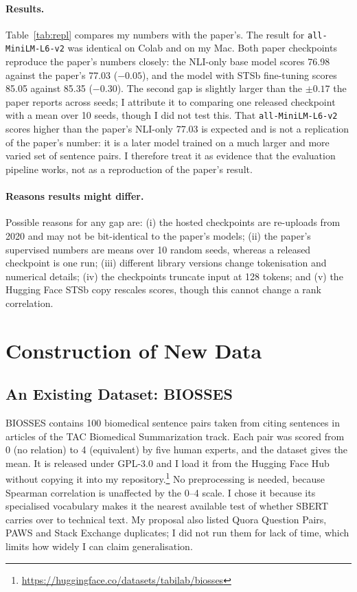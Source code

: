 \documentclass[11pt]{article}
\begin{document}
\paragraph{Results.}
Table~\ref{tab:repl} compares my numbers with the paper's. The result for \texttt{all-MiniLM-L6-v2} was identical on Colab and on my Mac. Both paper checkpoints reproduce the paper's numbers closely: the NLI-only base model scores 76.98 against the paper's 77.03 ($-0.05$), and the model with STSb fine-tuning scores 85.05 against 85.35 ($-0.30$). The second gap is slightly larger than the $\pm 0.17$ the paper reports across seeds; I attribute it to comparing one released checkpoint with a mean over 10 seeds, though I did not test this. That \texttt{all-MiniLM-L6-v2} scores higher than the paper's NLI-only 77.03 is expected and is not a replication of the paper's number: it is a later model trained on a much larger and more varied set of sentence pairs. I therefore treat it as evidence that the evaluation pipeline works, not as a reproduction of the paper's result.

\paragraph{Reasons results might differ.}
Possible reasons for any gap are: (i) the hosted checkpoints are re-uploads from 2020 and may not be bit-identical to the paper's models; (ii) the paper's supervised numbers are means over 10 random seeds, whereas a released checkpoint is one run; (iii) different library versions change tokenisation and numerical details; (iv) the checkpoints truncate input at 128 tokens; and (v) the Hugging Face STSb copy rescales scores, though this cannot change a rank correlation.

\section{Construction of New Data}
\label{sec:newdata}

\subsection{An Existing Dataset: BIOSSES}
BIOSSES \citep{soganciouglu2017biosses} contains 100 biomedical sentence pairs taken from citing sentences in articles of the TAC Biomedical Summarization track. Each pair was scored from 0 (no relation) to 4 (equivalent) by five human experts, and the dataset gives the mean. It is released under GPL-3.0 and I load it from the Hugging Face Hub without copying it into my repository.\footnote{\url{https://huggingface.co/datasets/tabilab/biosses}} No preprocessing is needed, because Spearman correlation is unaffected by the 0--4 scale. I chose it because its specialised vocabulary makes it the nearest available test of whether SBERT carries over to technical text. My proposal also listed Quora Question Pairs, PAWS and Stack Exchange duplicates; I did not run them for lack of time, which limits how widely I can claim generalisation.
\end{document}
